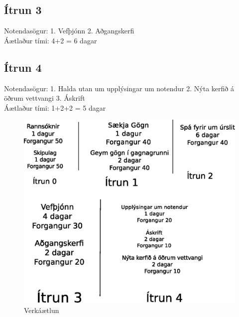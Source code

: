 \documentclass[a4paper,11pt]{article}
\begin{document}
\subsection{Ítrun 3}
Notendasögur: 1. Vefþjónn 2. Aðgangskerfi\\
Áætlaður tími: 4+2 = 6 dagar

\subsection{Ítrun 4}
Notendasögur: 1. Halda utan um upplýsingar um notendur 2. Nýta kerfið á öðrum vettvangi 3. Áskrift\\
Áætlaður tími: 1+2+2 = 5 dagar
\begin{figure}[H]
  \centering
  \includegraphics{verkaetlun.eps}
  \caption{Verkáætlun}
  \label{fig:verkaetlun}
\end{figure}
\end{document}
